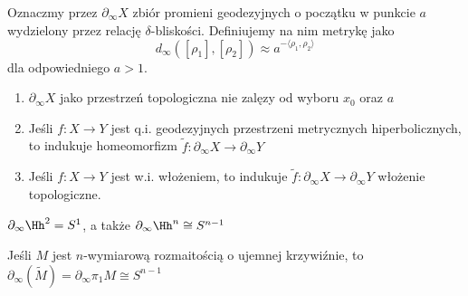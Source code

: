 \begin{definition}{}{}
  Oznaczmy przez $\partial_\infty X$ zbiór promieni geodezyjnych o początku w punkcie $a$ wydzielony przez relację $\delta$-bliskości. Definiujemy na nim metrykę jako
  $$d_\infty([\rho_1], [\rho_2])\approx a^{-\langle \rho_1, \rho_2\rangle}$$
  dla odpowiedniego $a>1$.
\end{definition}

\begin{theorem}{}{}
  \begin{enumerate}
    \item $\partial_\infty X$ jako przestrzeń topologiczna nie zalęzy od wyboru $x_0$ oraz $a$
    \item Jeśli $f:X\to Y$ jest q.i. geodezyjnych przestrzeni metrycznych hiperbolicznych, to indukuje homeomorfizm $\widetilde{f}:\partial _\infty X\to \partial_\infty Y$
    \item Jeśli $f:X\to Y$ jest w.i. włożeniem, to indukuje $\widetilde{f}:\partial_\infty X\to \partial_\infty Y$ włożenie topologiczne.
  \end{enumerate}
\end{theorem}

\begin{example}[m]
  \item $\partial_\infty \Hh^2=S^1$, a także $\partial_\infty \Hh^n\cong S^{n-1}$
  \item Jeśli $M$ jest $n$-wymiarową rozmaitością o ujemnej krzywiźnie, to $\partial_\infty(\widetilde{M})=\partial_\infty\pi_1M\cong S^{n-1}$
\end{example}




